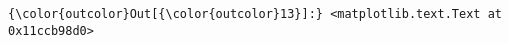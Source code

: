 \documentclass[11pt]{article}
\begin{document}
\begin{Verbatim}[commandchars=\\\{\}]
{\color{outcolor}Out[{\color{outcolor}13}]:} <matplotlib.text.Text at 0x11ccb98d0>
\end{Verbatim}

    \begin{center}
    \end{center}
    { \hspace*{\fill} \\}





    
\end{document}
